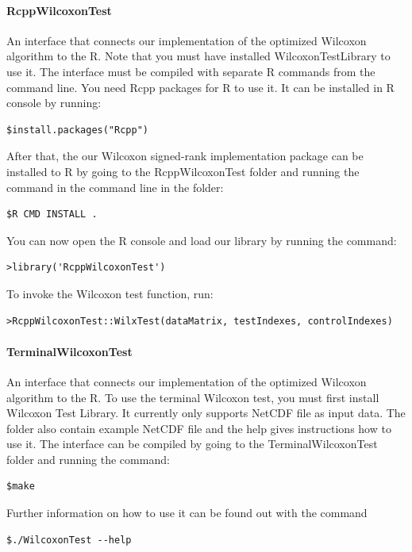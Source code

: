 \documentclass[12pt]{article}
\begin{document}
\paragraph{RcppWilcoxonTest}
An interface that connects our implementation of the optimized Wilcoxon algorithm to the R. Note that you must have installed WilcoxonTestLibrary to use it. The interface must be compiled with separate R commands from the command line. You need Rcpp packages for R to use it. It can be installed in R console by running:
\begin{lstlisting}
$install.packages("Rcpp")
\end{lstlisting}

After that, the our Wilcoxon signed-rank implementation package can be installed to R by going to the RcppWilcoxonTest folder and running the command in the command line in the folder:

\begin{lstlisting}
$R CMD INSTALL .
\end{lstlisting}

You can now open the R console and load our library by running the command:

\begin{lstlisting}
>library('RcppWilcoxonTest')
\end{lstlisting}

To invoke the Wilcoxon test function, run:

\begin{lstlisting}
>RcppWilcoxonTest::WilxTest(dataMatrix, testIndexes, controlIndexes)
\end{lstlisting}

\paragraph{TerminalWilcoxonTest}

An interface that connects our implementation of the optimized Wilcoxon algorithm to the R. To use the terminal Wilcoxon test, you must first install Wilcoxon Test Library. It currently only supports NetCDF file as input data. The folder also contain example NetCDF file and the help gives instructions how to use it. The interface can be compiled by going to the TerminalWilcoxonTest folder and running the command:
\begin{lstlisting}
$make
\end{lstlisting}

Further information on how to use it can be found out with the command
\begin{lstlisting}
$./WilcoxonTest --help
\end{lstlisting}
\end{document}
